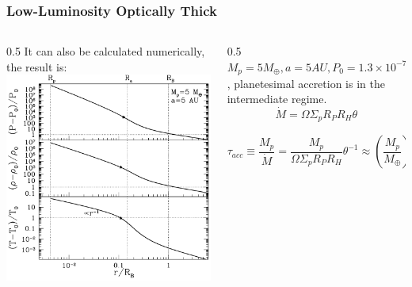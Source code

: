 \documentclass{beamer}
\begin{document}
\begin{frame}
\frametitle{Low-Luminosity Optically Thick}
\begin{columns}[t] 
\begin{column}{0.5\textwidth} 
It can also be calculated numerically, the result is:
\vspace{-0.1cm}
\includegraphics[width=\textwidth]{Low-Luminosity Optically Thick.png}
\end{column} 
\begin{column}{0.5\textwidth}
$M_p=5 M_{\oplus},a=5AU,P_0 =1.3 \times 10^{-7} \text{bar}, \rho_0 =3 \times 10^{-11} \text{g cm}^{-3},T_0= 130 \text{K}, \alpha=0, \beta=1, \gamma = \frac{7}{5}, \kappa_0=0.1 \text{cm}^2 \text{g}^{-1}$, planetesimal accretion is in the intermediate regime.
\begin{equation}
\tag{A1}
\dot{M}=\Omega \Sigma_p R_P R_H \theta
\end{equation}
\begin{equation}
\tag{A2}
\scriptscriptstyle \tau_{acc}\equiv \frac{M_p}{\dot{M}}=\frac{M_p}{\Omega \Sigma_p R_P R_H}\theta^{-1} \approx (\frac{M_p}{M_{\oplus}})^{1/3} \left\{ \begin{array}{ll}\scriptscriptstyle 3 \times 10^{10} \, \text{yr} \, a_{10}^3, & \text{slow}, \\ \scriptscriptstyle 1.4 \times 10^7 \, \text{yr} \, a_{10}^2, & \text{intermediate}, \\ \scriptscriptstyle 3 \times 10^5 \, \text{yr} \, a_{10}^{3/2}, & \text{fast}. \end{array} \right\}
\end{equation}
\end{column} 
\end{columns}
\end{frame}
\end{document}
